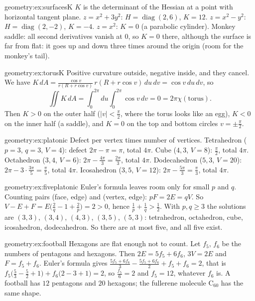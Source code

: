\begin{solution}{geometry:ex:surfacesK}
\idea $K$ is the determinant of the Hessian at a point with horizontal tangent plane.
\writeup $z=x^2+3y^2$: $H=\operatorname{diag}(2,6)$, $K=12$. $z=x^2-y^2$: $H=\operatorname{diag}(2,-2)$, $K=-4$. $z=x^2$: $K=0$ (a parabolic cylinder). Monkey saddle:
all second derivatives vanish at $0$, so $K=0$ there, although the surface is far from flat: it goes up and down three times around the origin (room for the
monkey's tail).
\end{solution}

\begin{solution}{geometry:ex:torusK}
\idea Positive curvature outside, negative inside, and they cancel.
\writeup We have $K\,dA=\frac{\cos v}{r(R+r\cos v)}\,r(R+r\cos v)\,du\,dv=\cos v\,du\,dv$, so
\[\iint K\,dA=\int_0^{2\pi}du\int_0^{2\pi}\cos v\,dv=0=2\pi\chi(\text{torus}).\]
Then $K>0$ on the outer half
($|v|<\frac\pi2$, where the torus looks like an egg), $K<0$ on the inner half (a saddle), and $K=0$ on the top and bottom circles $v=\pm\frac\pi2$.
\end{solution}

\begin{solution}{geometry:ex:platonic}
\idea Defect per vertex times number of vertices.
\writeup Tetrahedron ($p=3$, $q=3$, $V=4$): defect $2\pi-\pi=\pi$, total $4\pi$. Cube ($4,3$, $V=8$): $\frac\pi2$, total $4\pi$. Octahedron ($3,4$, $V=6$): $2\pi-\frac{4\pi}3=\frac{2\pi}3$, total
$4\pi$. Dodecahedron ($5,3$, $V=20$): $2\pi-3\cdot\frac{3\pi}5=\frac\pi5$, total $4\pi$. Icosahedron ($3,5$, $V=12$): $2\pi-\frac{5\pi}3=\frac\pi3$, total $4\pi$.
\end{solution}

\begin{solution}{geometry:ex:fiveplatonic}
\idea Euler's formula leaves room only for small $p$ and $q$.
\writeup Counting pairs (face, edge) and (vertex, edge): $pF=2E=qV$. So $V-E+F=E\bigl(\frac2q-1+\frac2p\bigr)=2>0$, hence $\frac1p+\frac1q>\frac12$. With $p,q\ge3$ the
solutions are $(3,3)$, $(3,4)$, $(4,3)$, $(3,5)$, $(5,3)$: tetrahedron, octahedron, cube, icosahedron, dodecahedron. So there are at most five, and all five exist.
\end{solution}

\begin{solution}{geometry:ex:football}
\idea Hexagons are flat enough not to count.
\writeup Let $f_5$, $f_6$ be the numbers of pentagons and hexagons. Then $2E=5f_5+6f_6$, $3V=2E$ and $F=f_5+f_6$. Euler's formula gives
$\frac{5f_5+6f_6}3-\frac{5f_5+6f_6}2+f_5+f_6=2$, that is $f_5\bigl(\frac53-\frac52+1\bigr)+f_6\bigl(2-3+1\bigr)=2$, so $\frac{f_5}6=2$ and $f_5=12$, whatever $f_6$ is. A football
has $12$ pentagons and $20$ hexagons; the fullerene molecule C$_{60}$ has the same shape.
\end{solution}

